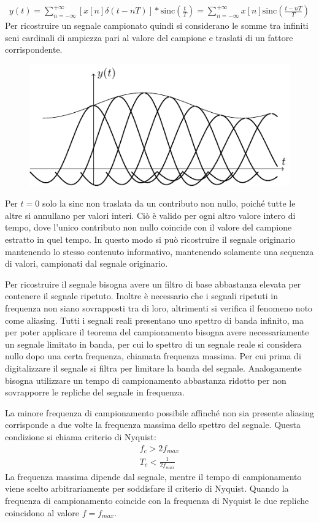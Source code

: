 \documentclass{article}
\newcommand{\sinc}{\mathrm{sinc}}
\numberwithin{equation}{subsection}
\begin{document}
\begin{gather*}
    y(t)=\displaystyle\sum_{n=-\infty}^{+\infty}\left[x[n]\delta(t-nT)\right]*\sinc\left(\frac{t}{T}\right)=\sum_{n=-\infty}^{+\infty}x[n]\sinc\left(\frac{t-nT}{T}\right)
\end{gather*}
Per ricostruire un segnale campionato quindi si considerano le somme tra infiniti seni cardinali di ampiezza pari al valore del campione e traslati di un fattore corrispondente. 
\begin{figure}[H]%
    \centering
    \includegraphics{segnale-ricostruito.pdf}
\end{figure}

Per $t=0$ solo la sinc non traslata da un contributo non nullo, poiché tutte le altre si annullano per valori interi. Ciò è valido per ogni altro valore intero di tempo, dove 
l'unico contributo non nullo coincide con il valore del campione estratto in quel tempo. In questo modo si può ricostruire il segnale originario mantenendo lo stesso contenuto 
informativo, mantenendo solamente una sequenza di valori, campionati dal segnale originario. 


Per ricostruire il segnale bisogna avere un filtro di base abbastanza elevata per contenere il segnale ripetuto. Inoltre è necessario che i segnali ripetuti in frequenza non siano 
sovrapposti tra di loro, altrimenti si verifica il fenomeno noto come aliasing. 
Tutti i segnali reali presentano uno spettro di banda infinito, ma per poter applicare il teorema del campionamento bisogna avere necessariamente un segnale limitato in banda, 
per cui lo spettro di un segnale reale si considera nullo dopo una certa frequenza, chiamata frequenza massima. Per cui prima di digitalizzare il segnale si filtra per 
limitare la banda del segnale. Analogamente bisogna utilizzare un tempo di campionamento abbastanza ridotto per non sovrapporre le repliche del segnale in frequenza. 

La minore frequenza di campionamento possibile affinché non sia presente aliasing corrisponde a due volte la frequenza massima dello spettro del segnale. Questa condizione 
si chiama criterio di Nyquist:
\begin{gather*}
    f_c>2f_{max}\\
    T_c<\displaystyle\frac{1}{2f_{max}}
\end{gather*}
La frequenza massima dipende dal segnale, mentre il tempo di campionamento viene scelto arbitrariamente per soddisfare il criterio di Nyquist. Quando la frequenza di campionamento 
coincide con la frequenza di Nyquist le due repliche coincidono al valore $f=f_{max}$. 
\end{document}

